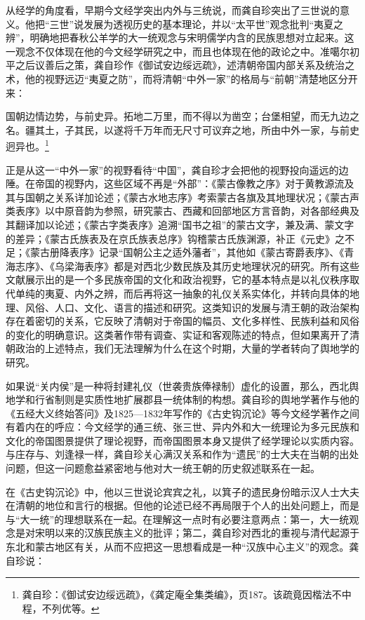 \documentclass[a4paper, 12pt, openright]{ctexbook}
\renewenvironment{quote}
  {\list{}{\rightmargin2\ccwd \leftmargin2\ccwd \itemindent=2\ccwd \listparindent=2\ccwd}%
   \item\relax\small\kaishu\color{black}}
  {\endlist}
\begin{document}
从经学的角度看，早期今文经学突出内外与三统说，而龚自珍突出了三世说的意义。他把“三世”说发展为透视历史的基本理论，并以“太平世”观念批判“夷夏之辨”，明确地把春秋公羊学的大一统观念与宋明儒学内含的民族思想对立起来。这一观念不仅体现在他的今文经学研究之中，而且也体现在他的政论之中。准噶尔初平之后议善后之策，龚自珍作《御试安边绥远疏》，述清朝帝国内部关系及统治之术，他的视野远迈“夷夏之防”，而将清朝“中外一家”的格局与“前朝”清楚地区分开来：

\begin{quote}
国朝边情边势，与前史异。拓地二万里，而不得以为凿空；台堡相望，而无九边之名。疆其土，子其民，以遂将千万年而无尺寸可议弃之地，所由中外一家，与前史迥异也。\footnote{龚自珍：《御试安边绥远疏》，《龚定庵全集类编》，页187。该疏竟因楷法不中程，不列优等。}
\end{quote}

正是从这一“中外一家”的视野看待“中国”，龚自珍才会把他的视野投向遥远的边陲。在帝国的视野内，这些区域不再是“外部”：《蒙古像教之序》对于黄教源流及其与国朝之关系详加论述；《蒙古水地志序》考索蒙古各旗及其地理状况；《蒙古声类表序》以中原音韵为参照，研究蒙古、西藏和回部地区方言音韵，对各部经典及其翻译加以论述；《蒙古字类表序》追溯“国书之祖”的蒙古文字，兼及满、蒙文字的差异；《蒙古氏族表及在京氏族表总序》钩稽蒙古氏族渊源，补正《元史》之不足；《蒙古册降表序》记录“国朝公主之适外藩者”，其他如《蒙古寄爵表序》、《青海志序》、《乌梁海表序》都是对西北少数民族及其历史地理状况的研究。所有这些文献展示出的是一个多民族帝国的文化和政治视野，它的基本特点是以礼仪秩序取代单纯的夷夏、内外之辨，而后再将这一抽象的礼仪关系实体化，并转向具体的地理、风俗、人口、文化、语言的描述和研究。这类知识的发展与清王朝的政治架构存在着密切的关系，它反映了清朝对于帝国的幅员、文化多样性、民族利益和风俗的变化的明确意识。这类著作带有调查、实证和客观陈述的特点，但如果离开了清朝政治的上述特点，我们无法理解为什么在这个时期，大量的学者转向了舆地学的研究。

如果说“关内侯”是一种将封建礼仪（世袭贵族俸禄制）虚化的设置，那么，西北舆地学和行省制则是实质性地扩展郡县一统体制的构想。龚自珍的舆地学著作与他的《五经大义终始答问》及1825—1832年写作的《古史钩沉论》等今文经学著作之间有着内在的呼应：今文经学的通三统、张三世、异内外和大一统理论为多元民族和文化的帝国图景提供了理论视野，而帝国图景本身又提供了经学理论以实质内容。与庄存与、刘逢禄一样，龚自珍关心满汉关系和作为“遗民”的士大夫在当朝的出处问题，但这一问题愈益紧密地与他对大一统王朝的历史叙述联系在一起。

在《古史钩沉论》中，他以三世说论宾宾之礼，以箕子的遗民身份暗示汉人士大夫在清朝的地位和言行的根据。但他的论述已经不再局限于个人的出处问题上，而是与“大一统”的理想联系在一起。在理解这一点时有必要注意两点：第一，大一统观念是对宋明以来的汉族民族主义的批评；第二，龚自珍对西北的重视与清代起源于东北和蒙古地区有关，从而不应把这一思想看成是一种“汉族中心主义”的观念。龚自珍说：
\end{document}
